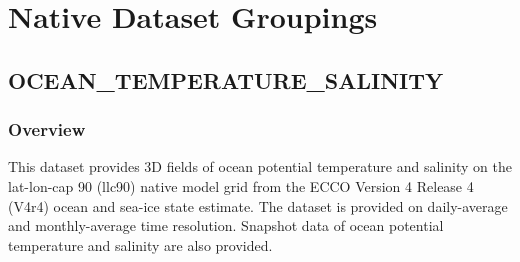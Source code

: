 \section{Native Dataset Groupings}
\subsection{OCEAN\_TEMPERATURE\_SALINITY}
\subsubsection{Overview}
\newp
This dataset provides 3D fields of ocean potential temperature and salinity on the lat-lon-cap 90 (llc90) native model grid from the ECCO Version 4 Release 4 (V4r4) ocean and sea-ice state estimate. The dataset is provided on daily-average and monthly-average time resolution. Snapshot data of ocean potential temperature and salinity are also provided.
\\\\
